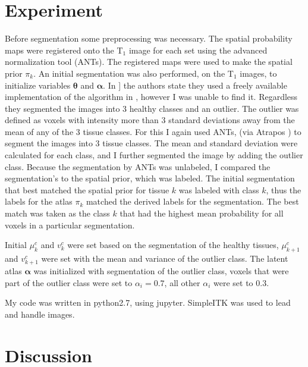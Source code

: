 \documentclass[10pt,twocolumn,letterpaper]{article}
\begin{document}
\section{Experiment}
Before segmentation some preprocessing was necessary. The spatial probability maps were registered onto the T$_{\text{1}}$ image for each set using the advanced normalization tool (ANTs). The registered maps were used to make the spatial prior $\pi_k$. An initial segmentation was also performed, on the T$_{\text{1}}$ images, to initialize variables $\boldsymbol{\theta}$ and $\boldsymbol{\alpha}$.  In \cite{Menze2010}] the authors state they used a freely available implementation of the algorithm in \cite{leemput}, however I was unable to find it. Regardless they segmented the images into 3 healthy classes and an outlier. The outlier was defined as voxels with intensity more than 3 standard deviations away from the mean of any of the 3 tissue classes. For this I again used ANTs, (via Atrapos \cite{atropos}) to segment the images into 3 tissue classes. The mean and standard deviation were calculated for each class, and I further segmented the image by adding the outlier class. Because the segmentation by ANTs was unlabeled, I compared the segmentation's to the spatial prior, which was labeled. The initial segmentation that best matched the spatial prior for tissue $k$ was labeled with class $k$, thus the labels for the atlas $\pi_k$ matched the derived labels for the segmentation. The best match was taken as the class $k$ that had the highest mean probability for all voxels in a particular segmentation. 

Initial $\mu_k^c$ and $v_k^c$ were set based on the segmentation of the healthy tissues, $\mu_{k+1}^c$ and $v_{k+1}^c$ were set with the mean and variance of the outlier class. The latent atlas $\boldsymbol{\alpha}$ was initialized with segmentation of the outlier class, voxels that were part of the outlier class were set to $\alpha_i=0.7$, all other $\alpha_i$ were set to 0.3.

My code was written in python2.7, using jupyter. SimpleITK was used to lead and handle images.


\section{Discussion}
\end{document}
